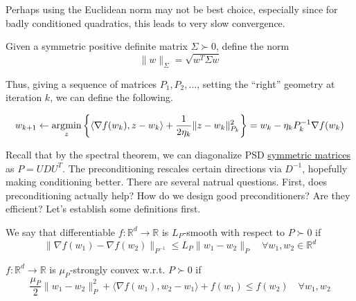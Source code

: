 	Perhaps using the Euclidean norm may not be best choice, especially since for badly conditioned quadratics, this leads to very slow convergence. 

	\begin{definition}
	  \label{def:mahalanobis-norm}
	  Given a symmetric positive definite matrix $\Sigma \succ 0$, define the norm 
		\begin{equation}
			\|w\|_\Sigma = \sqrt{w^T \Sigma w}
		\end{equation}
	\end{definition}

	Thus, giving a sequence of matrices $P_1, P_2, \ldots$, setting the ``right'' geometry at iteration $k$, we can define the following. 

	\begin{definition}
	  \label{def:preconditioned-gradient-descent}
		\begin{equation}
			w_{k+1} \gets \operatorname*{\arg\!\min}_z \bigg\{ \langle \nabla f(w_k), z - w_k \rangle + \frac{1}{2\eta_k} \|z - w_k\|_{P_k}^2 \bigg\} = w_k - \eta_k P_k^{-1} \nabla f(w_k)
		\end{equation}
	\end{definition}

	Recall that by the spectral theorem, we can diagonalize PSD \hyperref[lin-def:symmetric-matrices]{symmetric matrices} as $P = U D U^T$. The preconditioning rescales certain directions via $D^{-1}$, hopefully making conditioning better. There are several natrual questions. First, does preconditioning actually help? How do we design good preconditioners? Are they efficient? Let's establish some definitions first. 

	\begin{definition}[$L_P$-Smooth]
	  \label{def:lp-smooth}
		We say that differentiable $f: \mathbb{R}^d \to \mathbb{R}$ is $L_P$-smooth with respect to $P \succ 0$ if 
		\begin{equation}
			\|\nabla f(w_1) - \nabla f(w_2) \|_{P^{-1}} \leq L_P \|w_1 - w_2\|_P \quad \forall w_1, w_2 \in \mathbb{R}^d
		\end{equation}
	\end{definition}

	\begin{definition}
	  \label{def:mup-strongly-convex}
		$f: \mathbb{R}^d \to \mathbb{R}$ is $\mu_P$-strongly convex w.r.t. $P \succ 0$ if 
		 \begin{equation}
			 \frac{\mu_P}{2} \|w_1 - w_2 \|_P^2 + \langle \nabla f(w_1), w_2 - w_1 \rangle + f(w_1) \leq f(w_2) \quad \forall w_1, w_2
		 \end{equation}
	\end{definition}


